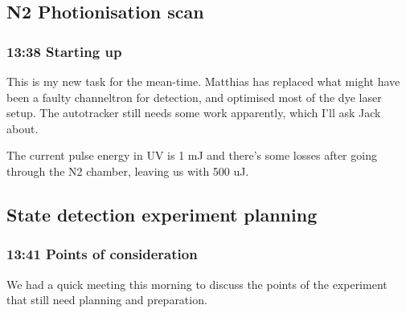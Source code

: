 \documentclass[11pt]{article}
\begin{document}
\subsection*{N2 Photionisation scan}
\label{sec-5-1}
\subsubsection*{13:38 Starting up}
\label{sec-5-1-1}

This is my new task for the mean-time. Matthias has replaced what
might have been a faulty channeltron for detection, and optimised most
of the dye laser setup. The autotracker still needs some work
apparently, which I'll ask Jack about. 

The current pulse energy in UV is 1 mJ and there's some losses after
going through the N2 chamber, leaving us with 500 uJ. 
\subsection*{State detection experiment planning}
\label{sec-5-2}
\subsubsection*{13:41 Points of consideration}
\label{sec-5-2-1}

We had a quick meeting this morning to discuss the points of the
experiment that still need planning and preparation.
\end{document}
